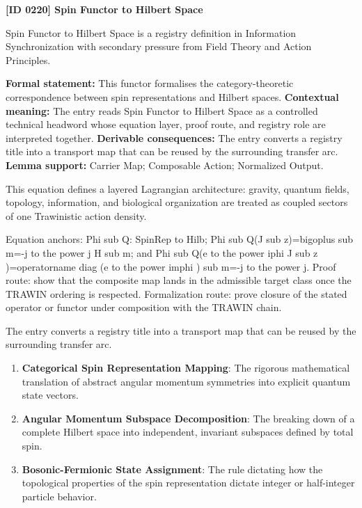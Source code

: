 \clearpage
\noindent\textbf{[ID 0220] Spin Functor to Hilbert Space}\par
\vspace{0.35em}
\begingroup\small
{}
Spin Functor to Hilbert Space is a registry definition in Information Synchronization with secondary pressure from Field Theory and Action Principles.

\begingroup\footnotesize\setlength{\emergencystretch}{3em}\sloppy
\textbf{Formal statement:} This functor formalises the category-theoretic correspondence between spin representations and Hilbert spaces. \textbf{Contextual meaning:} The entry reads Spin Functor to Hilbert Space as a controlled technical headword whose equation layer, proof route, and registry role are interpreted together. \textbf{Derivable consequences:} The entry converts a registry title into a transport map that can be reused by the surrounding transfer arc. \textbf{Lemma support:} Carrier Map; Composable Action; Normalized Output.\par
\endgroup

This equation defines a layered Lagrangian architecture: gravity, quantum fields, topology, information, and biological organization are treated as coupled sectors of one Trawinistic action density.

Equation anchors: Phi sub Q: SpinRep to Hilb; Phi sub Q(J sub z)=bigoplus sub m=-j to the power j H sub m; and Phi sub Q(e to the power iphi J sub z )=operatorname diag (e to the power imphi ) sub m=-j to the power j. Proof route: show that the composite map lands in the admissible target class once the TRAWIN ordering is respected. Formalization route: prove closure of the stated operator or functor under composition with the TRAWIN chain.

The entry converts a registry title into a transport map that can be reused by the surrounding transfer arc.
\endgroup

\begin{enumerate}[leftmargin=1.6em,itemsep=6pt,topsep=4pt]
\item \textbf{Categorical Spin Representation Mapping}: The rigorous mathematical translation of abstract angular momentum symmetries into explicit quantum state vectors.
\item \textbf{Angular Momentum Subspace Decomposition}: The breaking down of a complete Hilbert space into independent, invariant subspaces defined by total spin.
\item \textbf{Bosonic-Fermionic State Assignment}: The rule dictating how the topological properties of the spin representation dictate integer or half-integer particle behavior.
\end{enumerate}

